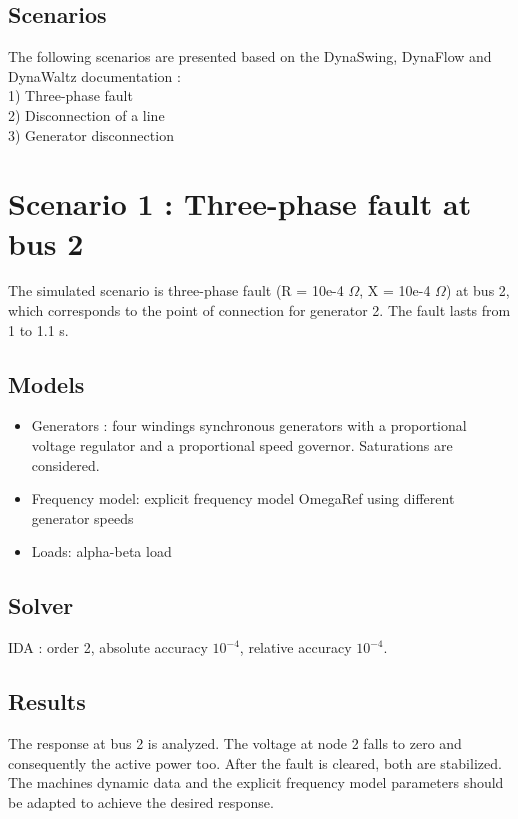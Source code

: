 \documentclass[a4paper, 12pt]{report}
\begin{document}
\section{Scenarios}

The following scenarios are presented based on the DynaSwing, DynaFlow and DynaWaltz documentation : \\

1) Three-phase fault \\
2) Disconnection of a line \\
3) Generator disconnection

\chapter{Scenario 1 : Three-phase fault at bus 2}

The simulated scenario is three-phase fault (R = 10e-4 $\Omega$, X = 10e-4 $\Omega$) at bus 2, which corresponds
to the point of connection for generator 2. The fault lasts from 1 to 1.1 s.

\section{Models}

\begin{itemize}
  \item Generators : four windings synchronous generators with a proportional voltage regulator and a proportional speed governor. Saturations are considered.
  \item Frequency model: explicit frequency model OmegaRef using different generator speeds
  \item Loads: alpha-beta load
\end{itemize}

\section{Solver}

IDA : order 2, absolute accuracy $10^{-4}$, relative accuracy $10^{-4}$.

\section{Results}

The response at bus 2 is analyzed. The voltage at node 2 falls to zero and consequently the active
power too. After the fault is cleared, both are stabilized. The machines dynamic data and the
explicit frequency model parameters should be adapted to achieve the desired response.
\end{document}

